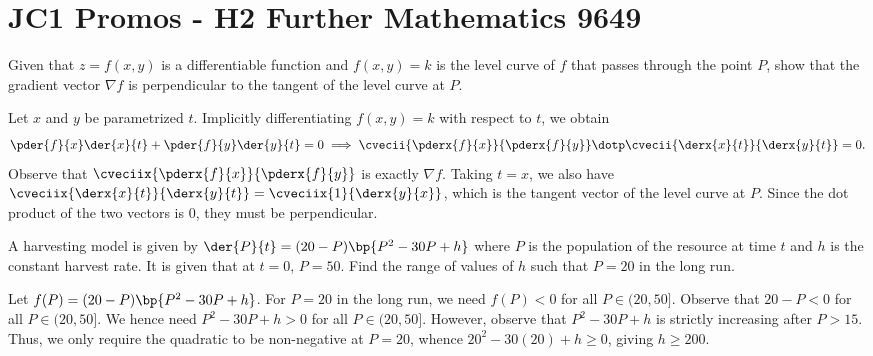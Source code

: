 \section{JC1 Promos - H2 Further Mathematics 9649}

\begin{problem}
    Given that $z = f(x, y)$ is a differentiable function and $f(x, y) = k$ is the level curve of $f$ that passes through the point $P$, show that the gradient vector $\nabla f$ is perpendicular to the tangent of the level curve at $P$.
\end{problem}
\begin{solution}
    Let $x$ and $y$ be parametrized $t$. Implicitly differentiating $f(x, y) = k$ with respect to $t$, we obtain \[\pder{f}{x} \der{x}{t} + \pder{f}{y} \der{y}{t} = 0 \implies \cvecii{\pderx{f}{x}}{\pderx{f}{y}} \dotp \cvecii{\derx{x}{t}}{\derx{y}{t}} = 0.\] Observe that $\cveciix{\pderx{f}{x}}{\pderx{f}{y}}$ is exactly $\nabla f$. Taking $t = x$, we also have $\cveciix{\derx{x}{t}}{\derx{y}{t}} = \cveciix{1}{\derx{y}{x}}$, which is the tangent vector of the level curve at $P$. Since the dot product of the two vectors is 0, they must be perpendicular.
\end{solution}

\begin{problem}
    A harvesting model is given by $\der{P}{t} = (20-P)\bp{P^2 - 30 P + h}$ where $P$ is the population of the resource at time $t$ and $h$ is the constant harvest rate. It is given that at $t = 0$, $P = 50$. Find the range of values of $h$ such that $P=20$ in the long run.
\end{problem}
\begin{solution}
    Let $f(P) = (20-P)\bp{P^2 - 30 P + h}$. For $P = 20$ in the long run, we need $f(P) < 0$ for all $P \in (20, 50]$. Observe that $20 -P < 0$ for all $P \in (20, 50]$. We hence need $P^2 - 30 P + h > 0$ for all $P \in (20, 50]$. However, observe that $P^2 - 30P + h$ is strictly increasing after $P > 15$. Thus, we only require the quadratic to be non-negative at $P = 20$, whence $20^2 - 30(20) + h \geq 0$, giving $h \geq 200$.
\end{solution}

